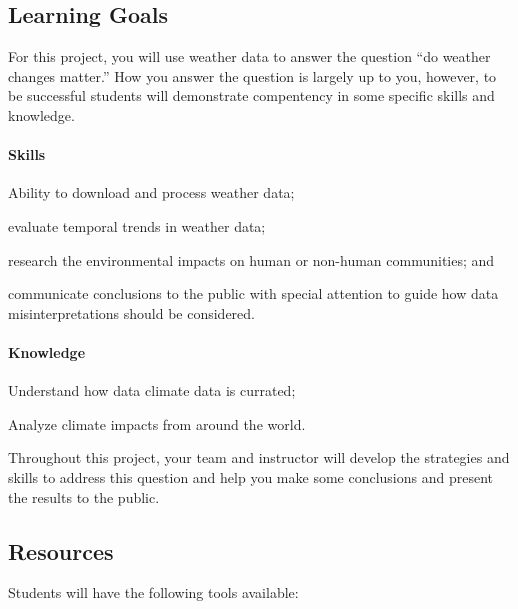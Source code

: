\documentclass{article}\usepackage[]{graphicx}\usepackage[]{color}
\newenvironment{itemize*}%
  {\begin{itemize}%
    \setlength{\itemsep}{0pt}%
    \setlength{\parskip}{0pt}}%
  {\end{itemize}}
\begin{document}
\subsection{Learning Goals}

For this project, you will use weather data to answer the question ``do weather changes matter.'' How you answer the question is largely up to you, however, to be successful students will demonstrate compentency in some specific skills and knowledge. 

\paragraph{Skills}

\begin{itemize*}
  \item Ability to download and process weather data;
  \item evaluate temporal trends in weather data;
  \item research the environmental impacts on human or non-human communities; and
  \item communicate conclusions to the public with special attention to guide how data misinterpretations should be considered.
\end{itemize*}

\paragraph{Knowledge}
\begin{itemize*}
  \item Understand how data climate data is currated;
  \item Analyze climate impacts from around the world.
\end{itemize*}

Throughout this project, your team and instructor will develop the strategies and skills to address this question and help you make some conclusions and present the results to the public.

\subsection{Resources}

Students will have the following tools available:
\end{document}
